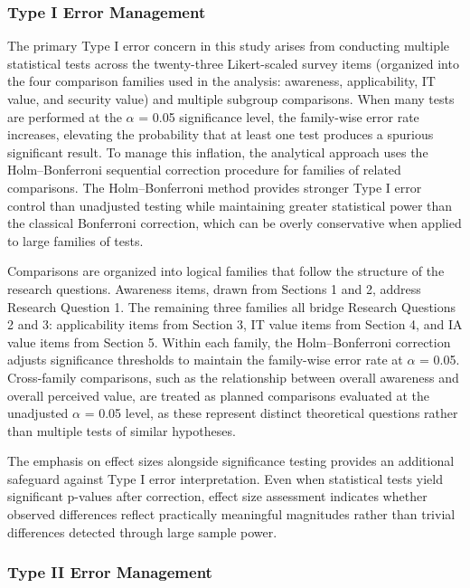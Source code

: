 \subsubsection{Type I Error Management}

The primary Type I error concern in this study arises from conducting multiple statistical tests across the twenty-three Likert-scaled survey items (organized into the four comparison families used in the analysis: awareness, applicability, IT value, and security value) and multiple subgroup comparisons. When many tests are performed at the \(\alpha\) = 0.05 significance level, the family-wise error rate increases, elevating the probability that at least one test produces a spurious significant result. To manage this inflation, the analytical approach uses the Holm--Bonferroni sequential correction procedure for families of related comparisons. The Holm--Bonferroni method provides stronger Type I error control than unadjusted testing while maintaining greater statistical power than the classical Bonferroni correction, which can be overly conservative when applied to large families of tests.

Comparisons are organized into logical families that follow the structure of the research questions. Awareness items, drawn from Sections 1 and 2, address Research Question 1. The remaining three families all bridge Research Questions 2 and 3: applicability items from Section 3, IT value items from Section 4, and IA value items from Section 5. Within each family, the Holm--Bonferroni correction adjusts significance thresholds to maintain the family-wise error rate at \(\alpha\) = 0.05. Cross-family comparisons, such as the relationship between overall awareness and overall perceived value, are treated as planned comparisons evaluated at the unadjusted \(\alpha\) = 0.05 level, as these represent distinct theoretical questions rather than multiple tests of similar hypotheses.

The emphasis on effect sizes alongside significance testing provides an additional safeguard against Type I error interpretation. Even when statistical tests yield significant p-values after correction, effect size assessment indicates whether observed differences reflect practically meaningful magnitudes rather than trivial differences detected through large sample power.

\subsubsection{Type II Error Management}

